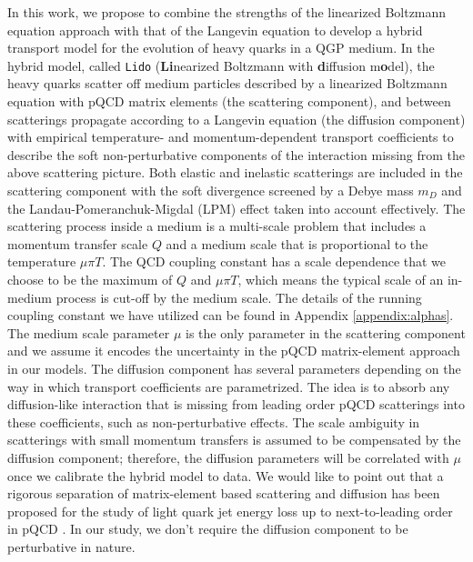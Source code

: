 \documentclass[aps, prc, reprint, amsmath, groupedaddress, nofootinbib]{revtex4-1}
\begin{document}
In this work, we propose to combine the strengths of the linearized Boltzmann equation approach with that of the Langevin equation to develop a hybrid transport model for the evolution of heavy quarks in a QGP medium.
In the hybrid model, called {\tt Lido} ({\bf Li}nearized Boltzmann with {\bf d}iffusion m{\bf o}del),  the heavy quarks scatter off medium particles described by a linearized Boltzmann equation with pQCD matrix elements (the scattering component), and between scatterings propagate according to a Langevin equation (the diffusion component) with empirical temperature- and momentum-dependent transport coefficients to describe the soft non-perturbative components of the interaction missing from the above scattering picture.
Both elastic and inelastic scatterings are included in the scattering component with the soft divergence screened by a Debye mass $m_D$ and the Landau-Pomeranchuk-Migdal (LPM) effect taken into account effectively.
The scattering process inside a medium is a multi-scale problem that includes a momentum transfer scale $Q$ and a medium scale that is proportional to the temperature $\mu\pi T$.
The QCD coupling constant has a scale dependence that we choose to be the maximum of $Q$ and $\mu\pi T$, which means the typical scale of an in-medium process is cut-off by the medium scale.
The details of the running coupling constant we have utilized can be found in Appendix \ref{appendix:alphas}.
The medium scale parameter $\mu$ is the only parameter in the scattering component and we assume it encodes the uncertainty in the pQCD matrix-element approach in our models.
The diffusion component has several parameters depending on the way in which transport coefficients are parametrized. 
The idea is to absorb any diffusion-like interaction that is missing from leading order pQCD scatterings into these coefficients, such as non-perturbative effects.
The scale ambiguity in scatterings with small momentum transfers is assumed to be compensated by the diffusion component; therefore, the diffusion parameters will be correlated with $\mu$ once we calibrate the hybrid model to data.
We would like to point out that a rigorous separation of matrix-element based scattering and diffusion has been proposed for the study of light quark jet energy loss up to next-to-leading order in pQCD \cite{Ghiglieri:2015ala}.
In our study, we don't require the diffusion component to be perturbative in nature.
\end{document}
